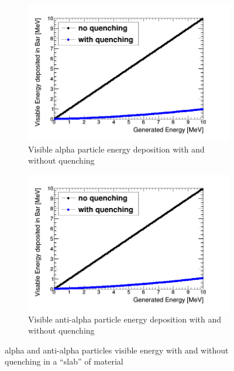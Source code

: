 \begin{figure}[H]
\centering
\begin{subfigure}{.5\textwidth}
  \centering
  \includegraphics[width=\linewidth]{quench_eng_Alpha.png}
  \captionsetup{width=.9\linewidth}
  \caption{Visible alpha particle energy deposition with and without quenching}
  \label{subFig:alpha_quenched_and_not}
\end{subfigure}%
\begin{subfigure}{.5\textwidth}
  \centering
  \includegraphics[width=\linewidth]{quench_eng_AAlpha.png}
  \captionsetup{width=.9\linewidth}
  \caption{Visible anti-alpha particle energy deposition with and without quenching}
  \label{subFig:Aalpha_quenched_and_not}
\end{subfigure}
\caption{alpha and anti-alpha particles visible energy with and without quenching in a ``slab'' of material}
\label{fig:alpha_Aalpha_quenched_and_not}
\end{figure}

